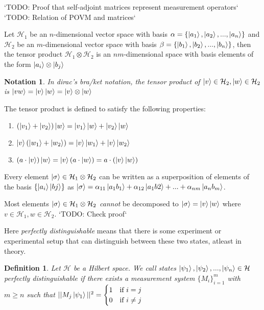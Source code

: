 \documentclass[12pt,twoside]{report}
\theoremstyle{thmstyle}
\newtheorem{defn}[subsection]{Definition}
\newtheorem{notation}[subsection]{Notation}
\begin{document}
`TODO: Proof that self-adjoint matrices represent measurement operators`
`TODO: Relation of POVM and matrices`

Let $\mathcal{H}_1$ be an $n$-dimensional vector space with basis $\alpha = \{ \ket{a_1}, \ket{a_2}, ..., \ket{a_n} \}$ and $\mathcal{H}_2$ be an $m$-dimensional vector space with basis $\beta = \{ \ket{b_1}, \ket{b_2}, ..., \ket{b_n} \}$, then the tensor product $\mathcal{H}_1 \otimes \mathcal{H}_2$ is an $nm$-dimensional space with basis elements of the form $\ket{a_i} \otimes \ket{b_j}$

\begin{notation}
    In dirac's bra/ket notation, the tensor product of $\ket{v} \in \mathcal{H}_2, \ket{w} \in \mathcal{H}_2$ is $\ket{vw} = \ket{v}\ket{w} = \ket{v} \otimes \ket{w}$
\end{notation}

The tensor product is defined to satisfy the following properties:
\begin{enumerate}
    \item $(\ket{v_1} + \ket{v_2} ) \ket{w} = \ket{v_1}\ket{w} + \ket{v_2}\ket{w}$
    \item $\ket{v}(\ket{w_1} + \ket{w_2}) =  \ket{v}\ket{w_1} + \ket{v}\ket{w_2}$
    \item $(a \cdot \ket{v})\ket{w} = \ket{v}(a \cdot \ket{w})  = a \cdot (\ket{v}\ket{w})$
\end{enumerate}
Every element $\ket{\sigma} \in \mathcal{H}_1 \otimes \mathcal{H}_2$ can be written as a superposition of elements of the basis $\{ \ket{a_i}\ket{bj} \}$ as $\ket{\sigma} = \alpha_{11} \ket{a_1 b_1} + \alpha_{12} \ket{a_1 b2} + ... + \alpha_{nm} \ket{a_n b_m}$.

Most elements $\ket{\sigma} \in \mathcal{H}_1 \otimes \mathcal{H}_2$ \textit{cannot} be decomposed to $\ket{\sigma} = \ket{v}\ket{w}$ where $v \in \mathcal{H}_1, w \in \mathcal{H}_2$.
`TODO: Check proof`

Here \textit{perfectly distinguishable} means that there is some experiment or experimental setup that can distinguish between these two states, atleast in theory.

\begin{defn}
            Let $\mathcal{H}$ be a Hilbert space. We call states $\ket{\psi_1}, \ket{\psi_2}, ..., \ket{\psi_n} \in \mathcal{H}$ perfectly distinguishable if there exists a measurement system $\{ M_i \}_{i=1}^m$ with $m \geq n$ such that $|| M_j \ket{\psi_1} ||^2 = \begin{cases} 1 & \text{if } i = j \\ 0 & \text{if } i \neq j \end{cases}$
\end{defn}
\end{document}

